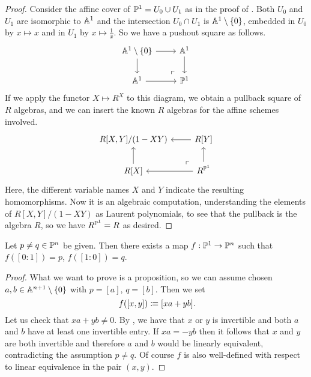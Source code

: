 \begin{proof}
  Consider the affine cover of $\mathbb{P}^1 = U_0 \cup U_1$
  as in the proof of .
  Both $U_0$ and $U_1$ are isomorphic to $\mathbb{A}^1$
  and the intersection $U_0 \cap U_1$ is $\mathbb{A}^1 \setminus \{0\}$,
  embedded in $U_0$ by $x \mapsto x$
  and in $U_1$ by $x \mapsto \frac{1}{x}$.
  So we have a pushout square as follows.
  \[ \begin{tikzcd}
    \A^1 \setminus \{0\} \ar[r] \ar[d]
    \ar[dr, phantom, very near end, "\ulcorner"] &
    \A^1 \ar[d] \\
    \A^1 \ar[r] &
    \bP^1
  \end{tikzcd} \]
  If we apply the functor $X \mapsto R^X$ to this diagram,
  we obtain a pullback square of $R$ algebras,
  and we can insert the known $R$ algebras for the affine schemes involved.
  \[ \begin{tikzcd}
    R[X, Y]/(1 - XY) &
    R[Y] \ar[l] \\
    R[X] \ar[u] &
    R^{\bP^1} \ar[l] \ar[u]
    \ar[lu, phantom, very near start, "\ulcorner"]
  \end{tikzcd} \]
  Here, the different variable names $X$ and $Y$ indicate
  the resulting homomorphisms.
  Now it is an algebraic computation,
  understanding the elements of $R[X, Y]/(1 - XY)$ as Laurent polynomials,
  to see that the pullback is the algebra $R$,
  so we have $R^{\mathbb{P}^1} = R$ as desired.
\end{proof}

\begin{lemma}%
  \label{parametrized-line-through-two-points-in-projective-space}
  Let $p \neq q \in \mathbb{P}^n$ be given.
  Then there exists a map $f : \mathbb{P}^1 \to \mathbb{P}^n$
  such that $f([0 : 1]) = p$, $f([1 : 0]) = q$.
\end{lemma}

\begin{proof}
  What we want to prove is a proposition,
  so we can assume chosen $a, b \in \mathbb{A}^{n+1} \setminus \{0\}$
  with $p = [a]$, $q = [b]$.
  Then we set
  \[ f([x, y]) \colonequiv [xa + yb] \rlap{.}\]
  Let us check that $xa + yb \neq 0$.
  By ,
  we have that $x$ or $y$ is invertible
  and both $a$ and $b$ have at least one invertible entry.
  If $xa = - yb$
  then it follows that $x$ and $y$ are both invertible
  and therefore $a$ and $b$ would be linearly equivalent,
  contradicting the assumption $p \neq q$.
  Of course $f$ is also well-defined
  with respect to linear equivalence in the pair $(x, y)$.
\end{proof}

